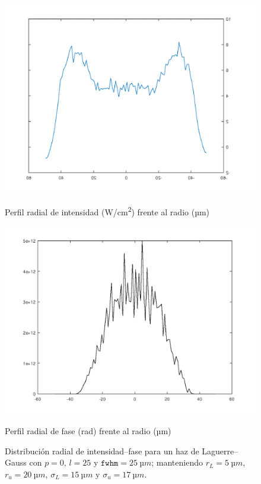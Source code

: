 \begin{figure}[htbp]
  \centering
  \begin{subcaptionblock}{.4\textwidth}
    \centering
    \includegraphics[width=\textwidth]{Figuras/anx_oamfs_4.png}
    \caption*{Perfil radial de intensidad (\unit{W/cm^2}) frente al radio (\unit{µm})}
  \end{subcaptionblock}
  \begin{subcaptionblock}{.4\textwidth}
    \centering
    \includegraphics[width=\textwidth]{Figuras/anx_oamint_4.png}
    \caption*{Perfil radial de fase (\unit{rad}) frente al radio (\unit{µm})}
  \end{subcaptionblock}
   \caption*{Distribución radial de intensidad--fase para un haz de Laguerre--Gauss con $p=0$, $l=25$ y $\texttt{fwhm}=\qty{25}{µm}$; manteniendo $r_{L}=\qty{5}{µm}$, $r_{u}=\qty{20}{µm}$, $\sigma_{L}=\qty{15}{µm}$ y $\sigma_{u}=\qty{17}{µm}$.}
\end{figure}

